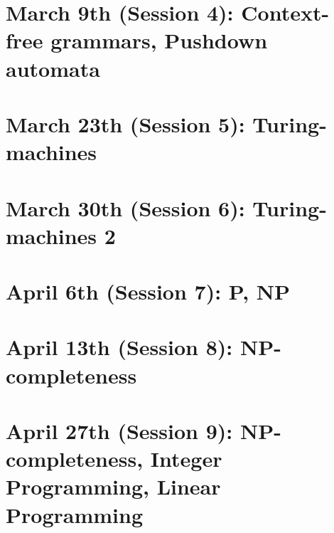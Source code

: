 \documentclass[a4paper]{article}
\begin{document}
\section{March 9th (Session 4): Context-free grammars, Pushdown automata}
\pagebreak
\pagebreak
\pagebreak
\pagebreak
\pagebreak
\pagebreak
\pagebreak
\pagebreak
\pagebreak
\pagebreak
\pagebreak
\pagebreak

\section{March 23th (Session 5): Turing-machines}
\pagebreak
\pagebreak
\pagebreak
\pagebreak
\pagebreak
\pagebreak
\pagebreak
\pagebreak
\pagebreak

\section{March 30th (Session 6): Turing-machines 2}
\pagebreak
\pagebreak
\pagebreak
\pagebreak
\pagebreak
\pagebreak
\pagebreak
\pagebreak

\section{April 6th (Session 7): P, NP}
\pagebreak
\pagebreak
\pagebreak
\pagebreak
\pagebreak
\pagebreak
\pagebreak
\pagebreak
\pagebreak

\section{April 13th (Session 8): NP-completeness}
\pagebreak
\pagebreak
\pagebreak
\pagebreak
\pagebreak
\pagebreak
\pagebreak
\pagebreak
\pagebreak
\pagebreak
\pagebreak
\pagebreak
\pagebreak

\section{April 27th (Session 9): NP-completeness, Integer Programming, Linear Programming}
\pagebreak
\pagebreak
\pagebreak
\pagebreak
\pagebreak
\pagebreak
\pagebreak
\pagebreak
\pagebreak
\pagebreak
\end{document}
